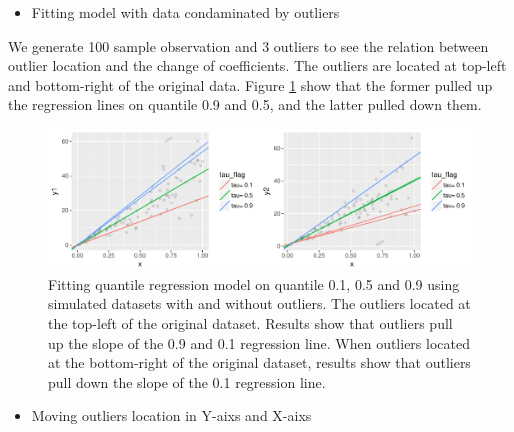 \documentclass[article]{jss}
\providecommand{\tightlist}{%
  \setlength{\itemsep}{0pt}\setlength{\parskip}{0pt}}
\theoremstyle{definition}
\theoremstyle{definition}
\theoremstyle{remark}
\begin{document}
\begin{itemize}
\tightlist
\item
  Fitting model with data condaminated by outliers
\end{itemize}

We generate 100 sample observation and 3 outliers to see the relation
between outlier location and the change of coefficients. The outliers
are located at top-left and bottom-right of the original data. Figure
\ref{fig:qr-outlier} show that the former pulled up the regression lines
on quantile 0.9 and 0.5, and the latter pulled down them.

\begin{CodeChunk}
\begin{figure}

{\centering \includegraphics{Diagnosing_outliers_and_visualization_of_quantile_regression_models_files/figure-latex/qr-outlier-1} 

}

\caption[Fitting quantile regression model on quantile 0.1, 0.5 and 0.9 using simulated datasets with and without outliers]{Fitting quantile regression model on quantile 0.1, 0.5 and 0.9 using simulated datasets with and without outliers. The outliers located at the top-left of the original dataset. Results show that outliers pull up the slope of the 0.9 and 0.1 regression line. When outliers located at the bottom-right of the original dataset, results show that outliers pull down the slope of the 0.1 regression line.}\label{fig:qr-outlier}
\end{figure}
\end{CodeChunk}

\begin{itemize}
\tightlist
\item
  Moving outliers location in Y-aixs and X-aixs
\end{itemize}
\end{document}
